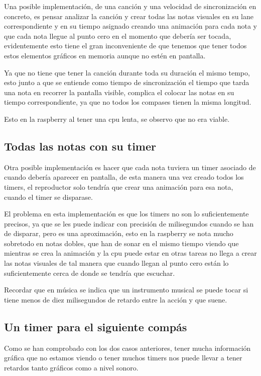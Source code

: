 \documentclass[a4paper,11pt,oneside]{book}
\begin{document}
Una posible implementación, de una canción y una velocidad de sincronización en concreto, es pensar analizar la canción y crear todas las notas visuales en su lane correspondiente y en su tiempo asignado creando una animación para cada nota y que cada nota llegue al punto cero en el momento que debería ser tocada, evidentemente esto tiene el gran inconveniente de que tenemos que tener todos estos elementos gráficos en memoria aunque no estén en pantalla.

Ya que no tiene que tener la canción durante toda su duración el mismo tempo, esto junto a que se entiende como tiempo de sincronización el tiempo que tarda una nota en recorrer la pantalla visible, complica el colocar las notas en su tiempo correspondiente, ya que no todos los compases tienen la misma longitud.

Esto en la raspberry al tener una cpu lenta, se observo que no era viable. 

\subsection{Todas las notas con su timer}

Otra posible implementación es hacer que cada nota tuviera un timer asociado de cuando debería aparecer en pantalla, de esta manera una vez creado todos los timers, el reproductor solo tendría que crear una animación para esa nota, cuando el timer se disparase.

El problema en esta implementación es que los timers no son lo suficientemente precisos, ya que se les puede indicar con precisión de milisegundos cuando se han de disparar, pero es una aproximación, esto en la raspberry se nota mucho sobretodo en notas dobles, que han de sonar en el mismo tiempo viendo que mientras se crea la animación y la cpu puede estar en otras tareas no llega a crear las notas visuales de tal manera que cuando llegan al punto cero están lo suficientemente cerca de donde se tendría que escuchar.

Recordar que en música se indica que un instrumento musical se puede tocar si tiene menos de diez milisegundos de retardo entre la acción y que suene.


\subsection{Un timer para el siguiente compás}

Como se han comprobado con los dos casos anteriores, tener mucha información gráfica que no estamos viendo o tener muchos timers nos puede llevar a tener retardos tanto gráficos como a nivel sonoro.
\end{document}
